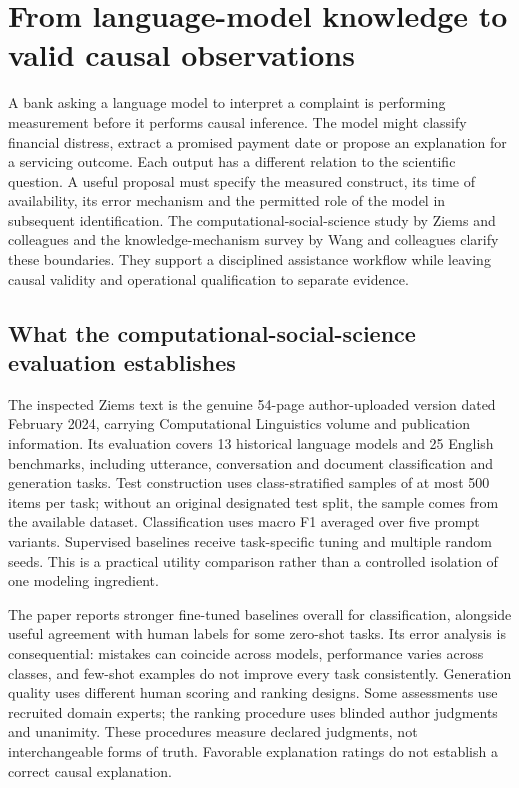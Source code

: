 \section{From language-model knowledge to valid causal observations}
\label{sec:exec24-css-knowledge}
A bank asking a language model to interpret a complaint is performing measurement before it performs causal inference. The model might classify financial distress, extract a promised payment date or propose an explanation for a servicing outcome. Each output has a different relation to the scientific question. A useful proposal must specify the measured construct, its time of availability, its error mechanism and the permitted role of the model in subsequent identification. The computational-social-science study by Ziems and colleagues and the knowledge-mechanism survey by Wang and colleagues clarify these boundaries. They support a disciplined assistance workflow while leaving causal validity and operational qualification to separate evidence.\citep{exec24_css_original,exec24_knowledge_original,exec24_css_knowledge_reference}

\subsection{What the computational-social-science evaluation establishes}
The inspected Ziems text is the genuine 54-page author-uploaded version dated February 2024, carrying Computational Linguistics volume and publication information. Its evaluation covers 13 historical language models and 25 English benchmarks, including utterance, conversation and document classification and generation tasks. Test construction uses class-stratified samples of at most 500 items per task; without an original designated test split, the sample comes from the available dataset. Classification uses macro F1 averaged over five prompt variants. Supervised baselines receive task-specific tuning and multiple random seeds. This is a practical utility comparison rather than a controlled isolation of one modeling ingredient.\citep{exec24_css_original}

The paper reports stronger fine-tuned baselines overall for classification, alongside useful agreement with human labels for some zero-shot tasks. Its error analysis is consequential: mistakes can coincide across models, performance varies across classes, and few-shot examples do not improve every task consistently. Generation quality uses different human scoring and ranking designs. Some assessments use recruited domain experts; the ranking procedure uses blinded author judgments and unanimity. These procedures measure declared judgments, not interchangeable forms of truth. Favorable explanation ratings do not establish a correct causal explanation.\citep{exec24_css_original}

